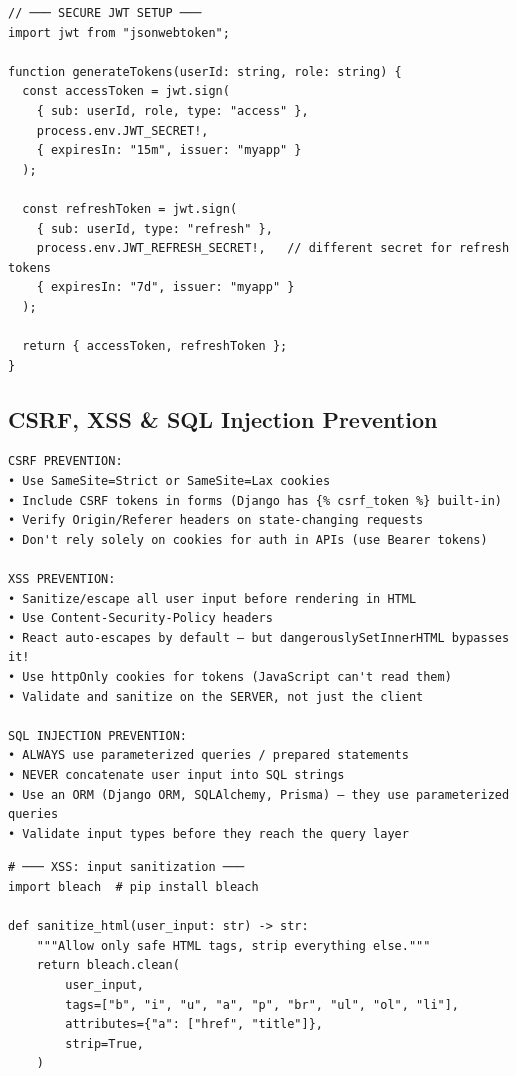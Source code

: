 \documentclass[10pt, a4paper]{article}
\begin{document}
\begin{lstlisting}[language=myjs]
// ─── SECURE JWT SETUP ───
import jwt from "jsonwebtoken";

function generateTokens(userId: string, role: string) {
  const accessToken = jwt.sign(
    { sub: userId, role, type: "access" },
    process.env.JWT_SECRET!,
    { expiresIn: "15m", issuer: "myapp" }
  );

  const refreshToken = jwt.sign(
    { sub: userId, type: "refresh" },
    process.env.JWT_REFRESH_SECRET!,   // different secret for refresh tokens
    { expiresIn: "7d", issuer: "myapp" }
  );

  return { accessToken, refreshToken };
}
\end{lstlisting}


\subsection{CSRF, XSS \& SQL Injection Prevention}


\begin{lstlisting}
CSRF PREVENTION:
• Use SameSite=Strict or SameSite=Lax cookies
• Include CSRF tokens in forms (Django has {% csrf_token %} built-in)
• Verify Origin/Referer headers on state-changing requests
• Don't rely solely on cookies for auth in APIs (use Bearer tokens)

XSS PREVENTION:
• Sanitize/escape all user input before rendering in HTML
• Use Content-Security-Policy headers
• React auto-escapes by default — but dangerouslySetInnerHTML bypasses it!
• Use httpOnly cookies for tokens (JavaScript can't read them)
• Validate and sanitize on the SERVER, not just the client

SQL INJECTION PREVENTION:
• ALWAYS use parameterized queries / prepared statements
• NEVER concatenate user input into SQL strings
• Use an ORM (Django ORM, SQLAlchemy, Prisma) — they use parameterized queries
• Validate input types before they reach the query layer
\end{lstlisting}


\begin{lstlisting}[language=mypython]
# ─── XSS: input sanitization ───
import bleach  # pip install bleach

def sanitize_html(user_input: str) -> str:
    """Allow only safe HTML tags, strip everything else."""
    return bleach.clean(
        user_input,
        tags=["b", "i", "u", "a", "p", "br", "ul", "ol", "li"],
        attributes={"a": ["href", "title"]},
        strip=True,
    )
\end{lstlisting}
\end{document}
